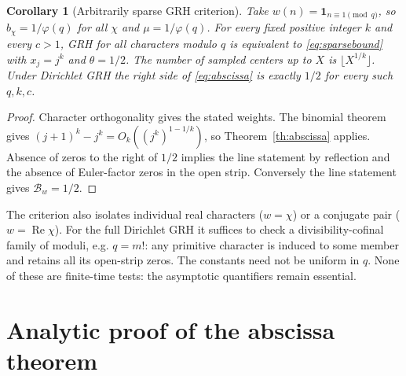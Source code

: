 \documentclass[11pt]{article}
\newtheorem{corollary}[theorem]{Corollary}
\theoremstyle{remark}\newtheorem{remark}[theorem]{Remark}
\newcommand{\Rea}{\operatorname{Re}}\newcommand{\Ima}{\operatorname{Im}}
\newcommand{\B}{\mathcal B}\newcommand{\W}{\mathcal W}
\begin{document}
\begin{corollary}[Arbitrarily sparse GRH criterion]\label{cor:sparse}
Take $w(n)=\mathbf1_{n\equiv1\pmod q}$, so $b_\chi=1/\varphi(q)$ for all $\chi$ and $\mu=1/\varphi(q)$. For every fixed positive integer $k$ and every $c>1$, GRH for all characters modulo $q$ is equivalent to \eqref{eq:sparsebound} with $x_j=j^k$ and $\theta=1/2$. The number of sampled centers up to $X$ is $\lfloor X^{1/k}\rfloor$. Under Dirichlet GRH the right side of \eqref{eq:abscissa} is exactly $1/2$ for every such $q,k,c$.
\end{corollary}
\begin{proof}
Character orthogonality gives the stated weights. The binomial theorem gives $(j+1)^k-j^k=O_k((j^k)^{1-1/k})$, so Theorem~\ref{th:abscissa} applies. Absence of zeros to the right of $1/2$ implies the line statement by reflection and the absence of Euler-factor zeros in the open strip. Conversely the line statement gives $\B_w=1/2$.
\end{proof}
The criterion also isolates individual real characters ($w=\chi$) or a conjugate pair ($w=\Rea\chi$). For the full Dirichlet GRH it suffices to check a divisibility-cofinal family of moduli, e.g. $q=m!$: any primitive character is induced to some member and retains all its open-strip zeros. The constants need not be uniform in $q$. None of these are finite-time tests: the asymptotic quantifiers remain essential.

\section{Analytic proof of the abscissa theorem}
\end{document}

